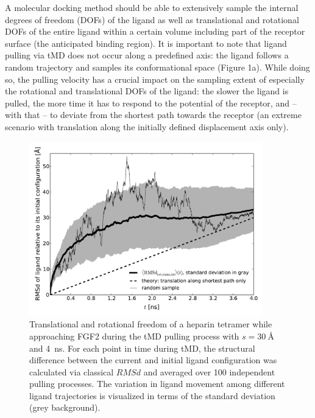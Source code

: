 A molecular docking method should be able to extensively sample the internal
degrees of freedom (DOFs) of the ligand as well as translational and rotational
DOFs of the entire ligand within a certain volume including part of the receptor
surface (the anticipated binding region). It is important to note that ligand
pulling via tMD does not occur along a predefined axis: the ligand follows a
random trajectory and samples its conformational space (Figure 1a). While doing
so, the pulling velocity has a crucial impact on the sampling extent of
especially the rotational and translational DOFs of the ligand: the slower the
ligand is pulled, the more time it has to respond to the potential of the
receptor, and -- with that -- to deviate from the shortest path towards the
receptor (an extreme scenario with translation along the initially defined
displacement axis only).

\begin{figure}
\centering
\includegraphics[width=0.9\textwidth]{gfx/dmd/figure_2_freedom_over_time_100samples_avg_stddev_randomone_pub_003.pdf}
\caption[]{
Translational and rotational freedom of a heparin tetramer while approaching
FGF2 during the tMD pulling process with $s=\SI{30}{\angstrom}$ and
\SI{4}{\nano\second}. For each point in time during tMD, the structural difference
between the current and initial ligand configuration was calculated via
classical $RMSd$ and averaged over 100 independent pulling processes. The
variation in ligand movement among different ligand trajectories is visualized
in terms of the standard deviation (grey background).
}
\label{fig:dmd:sampling}
\end{figure}



